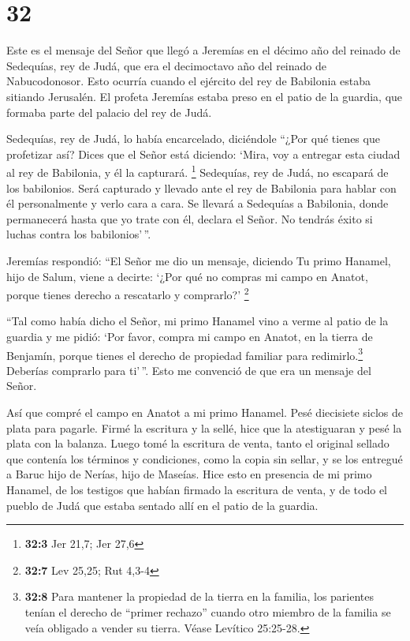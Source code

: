 \hypertarget{section-31}{%
\section{32}\label{section-31}}

 Este es el mensaje del Señor que llegó a Jeremías en el
décimo año del reinado de Sedequías, rey de Judá, que era el decimoctavo
año del reinado de Nabucodonosor.  Esto ocurría cuando el
ejército del rey de Babilonia estaba sitiando Jerusalén. El profeta
Jeremías estaba preso en el patio de la guardia, que formaba parte del
palacio del rey de Judá.

 Sedequías, rey de Judá, lo había encarcelado, diciéndole
``¿Por qué tienes que profetizar así? Dices que el Señor está diciendo:
`Mira, voy a entregar esta ciudad al rey de Babilonia, y él la
capturará. \footnote{\textbf{32:3} Jer 21,7; Jer 27,6} 
Sedequías, rey de Judá, no escapará de los babilonios. Será capturado y
llevado ante el rey de Babilonia para hablar con él personalmente y
verlo cara a cara.  Se llevará a Sedequías a Babilonia,
donde permanecerá hasta que yo trate con él, declara el Señor. No
tendrás éxito si luchas contra los babilonios'\,''.

 Jeremías respondió: ``El Señor me dio un mensaje,
diciendo  Tu primo Hanamel, hijo de Salum, viene a
decirte: `¿Por qué no compras mi campo en Anatot, porque tienes derecho
a rescatarlo y comprarlo?' \footnote{\textbf{32:7} Lev 25,25; Rut 4,3-4}

 ``Tal como había dicho el Señor, mi primo Hanamel vino a
verme al patio de la guardia y me pidió: `Por favor, compra mi campo en
Anatot, en la tierra de Benjamín, porque tienes el derecho de propiedad
familiar para redimirlo.\footnote{\textbf{32:8} Para mantener la
  propiedad de la tierra en la familia, los parientes tenían el derecho
  de ``primer rechazo'' cuando otro miembro de la familia se veía
  obligado a vender su tierra. Véase Levítico 25:25-28.} Deberías
comprarlo para ti'\,''. Esto me convenció de que era un mensaje del
Señor.

 Así que compré el campo en Anatot a mi primo Hanamel.
Pesé diecisiete siclos de plata para pagarle.  Firmé la
escritura y la sellé, hice que la atestiguaran y pesé la plata con la
balanza.  Luego tomé la escritura de venta, tanto el
original sellado que contenía los términos y condiciones, como la copia
sin sellar,  y se los entregué a Baruc hijo de Nerías,
hijo de Maseías. Hice esto en presencia de mi primo Hanamel, de los
testigos que habían firmado la escritura de venta, y de todo el pueblo
de Judá que estaba sentado allí en el patio de la guardia.

